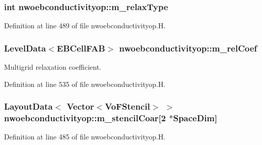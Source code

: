 \subsubsection[{\texorpdfstring{m\+\_\+relax\+Type}{m_relaxType}}]{\setlength{\rightskip}{0pt plus 5cm}int nwoebconductivityop\+::m\+\_\+relax\+Type\hspace{0.3cm}{\ttfamily [protected]}}\hypertarget{classnwoebconductivityop_ac378b4c945c1a87aaa0715101e2de6ab}{}\label{classnwoebconductivityop_ac378b4c945c1a87aaa0715101e2de6ab}


Definition at line 489 of file nwoebconductivityop.\+H.

\subsubsection[{\texorpdfstring{m\+\_\+rel\+Coef}{m_relCoef}}]{\setlength{\rightskip}{0pt plus 5cm}Level\+Data$<$E\+B\+Cell\+F\+AB$>$ nwoebconductivityop\+::m\+\_\+rel\+Coef\hspace{0.3cm}{\ttfamily [protected]}}\hypertarget{classnwoebconductivityop_a4978a58a23d91f5be85f3583359b3733}{}\label{classnwoebconductivityop_a4978a58a23d91f5be85f3583359b3733}


Multigrid relaxation coefficient. 



Definition at line 535 of file nwoebconductivityop.\+H.

\subsubsection[{\texorpdfstring{m\+\_\+stencil\+Coar}{m_stencilCoar}}]{\setlength{\rightskip}{0pt plus 5cm}Layout\+Data$<$ Vector$<$Vo\+F\+Stencil$>$ $>$ nwoebconductivityop\+::m\+\_\+stencil\+Coar\mbox{[}2 $\ast$Space\+Dim\mbox{]}\hspace{0.3cm}{\ttfamily [protected]}}\hypertarget{classnwoebconductivityop_a135457eeceb1e2d2c4f145883bfcf551}{}\label{classnwoebconductivityop_a135457eeceb1e2d2c4f145883bfcf551}


Definition at line 485 of file nwoebconductivityop.\+H.

